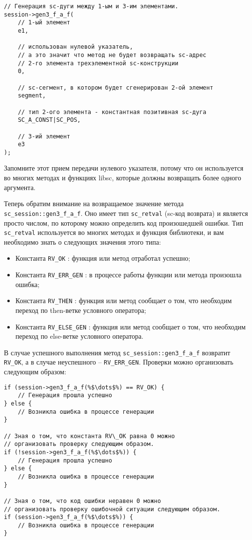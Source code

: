 \begin{lstlisting}[texcl]
// Генерация sc-дуги между 1-ым и 3-им элементами.
session->gen3_f_a_f(
    // 1-ый элемент
    e1,

    // использован нулевой указатель,
    // а это значит что метод не будет возвращать sc-адрес
    // 2-го элемента трехэлементной sc-конструкции
    0,

    // sc-сегмент, в котором будет сгенерирован 2-ой элемент
    segment,

    // тип 2-ого элемента - константная позитивная sc-дуга
    SC_A_CONST|SC_POS,

    // 3-ий элемент
    e3
);
\end{lstlisting}

Запомните этот прием передачи нулевого указателя, потому что он
используется во многих методах и функциях libsc, которые должны
возвращать более одного аргумента.

Теперь обратим внимание на возвращаемое значение метода
\lstinline|sc_session::gen3_f_a_f|. Оно имеет тип
\lstinline|sc_retval| (sc-код возврата) и является просто числом, по
которому можно определить код произошедшей ошибки. Тип
\lstinline|sc_retval| используется во многих методах и функция
библиотеки, и вам необходимо знать о следующих значения этого типа:


\begin{itemize}
\item Константа \lstinline|RV_OK| : функция или метод отработал
  успешно;
\item Константа \lstinline|RV_ERR_GEN| : в процессе работы функции или метода
  произошла ошибка;
\item Константа \lstinline|RV_THEN| : функция или метод сообщает о
  том, что необходим переход по then-ветке условного оператора;
\item Константа \lstinline|RV_ELSE_GEN| : функция или метод сообщает о
  том, что необходим переход по else-ветке условного оператора.
\end{itemize}

В случае успешного выполнения метод \lstinline|sc_session::gen3_f_a_f|
возвратит \lstinline|RV_OK|, а в случае неуспешного –
\lstinline|RV_ERR_GEN|. Проверки можно организовать следующим образом:
\begin{lstlisting}[texcl]
if (session->gen3_f_a_f(%$\dots$%) == RV_OK) {
    // Генерация прошла успешно
} else {
    // Возникла ошибка в процессе генерации
}

// Зная о том, что константа RV\_OK равна 0 можно
// организовать проверку следующим образом.
if (!session->gen3_f_a_f(%$\dots$%)) {
    // Генерация прошла успешно
} else {
    // Возникла ошибка в процессе генерации
}

// Зная о том, что код ошибки неравен 0 можно
// организовать проверку ошибочной ситуации следующим образом.
if (session->gen3_f_a_f(%$\dots$%)) {
    // Возникла ошибка в процессе генерации
}
\end{lstlisting}

